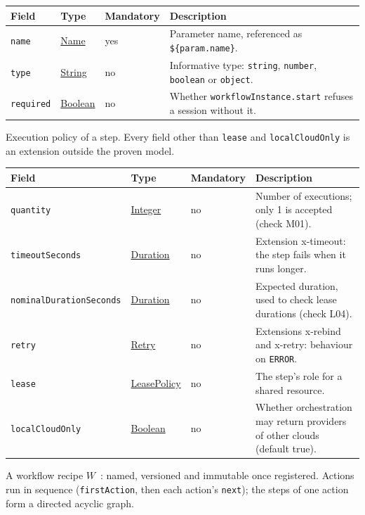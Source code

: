 \documentclass[a4paper]{arrowhead}
\newcommand{\mref}[1]{{\textcolor{ArrowheadPurple}{\hyperref[sec:model:#1]{#1}}}}
\newcommand{\pref}[1]{{\textcolor{ArrowheadGrey}{\hyperref[sec:model:primitives:#1]{#1}}}}
\begin{document}
{\small
\begin{longtable}{|p{3.7cm}|p{4.2cm}|p{1.6cm}|p{6.3cm}|}

\hline
\rowcolor{gray!33} Field & Type & Mandatory & Description \\ \hline
\endhead
\texttt{name} & \pref{Name} & yes & Parameter name, referenced as \texttt{\$\{param.name\}}. \\ \hline
\texttt{type} & \pref{String} & no & Informative type: \texttt{string}, \texttt{number}, \texttt{boolean} or \texttt{object}. \\ \hline
\texttt{required} & \pref{Boolean} & no & Whether \texttt{workflow\allowbreak{}Instance.\allowbreak{}start} refuses a session without it. \\ \hline
\end{longtable}
}

Execution policy of a step. Every field other than \texttt{lease} and \texttt{local\allowbreak{}Cloud\allowbreak{}Only} is an extension outside the proven model.

{\small
\begin{longtable}{|p{3.7cm}|p{4.2cm}|p{1.6cm}|p{6.3cm}|}

\hline
\rowcolor{gray!33} Field & Type & Mandatory & Description \\ \hline
\endhead
\texttt{quantity} & \pref{Integer} & no & Number of executions; only 1 is accepted (check M01). \\ \hline
\texttt{timeout\allowbreak{}Seconds} & \pref{Duration} & no & Extension x-timeout: the step fails when it runs longer. \\ \hline
\texttt{nominal\allowbreak{}Duration\allowbreak{}Seconds} & \pref{Duration} & no & Expected duration, used to check lease durations (check L04). \\ \hline
\texttt{retry} & \mref{Retry} & no & Extensions x-rebind and x-retry: behaviour on \texttt{ERROR}. \\ \hline
\texttt{lease} & \mref{LeasePolicy} & no & The step's role for a shared resource. \\ \hline
\texttt{local\allowbreak{}Cloud\allowbreak{}Only} & \pref{Boolean} & no & Whether orchestration may return providers of other clouds (default true). \\ \hline
\end{longtable}
}

A workflow recipe $W$~\cite{varga2026}: named, versioned and immutable once registered. Actions run in sequence (\texttt{firstAction}, then each action's \texttt{next}); the steps of one action form a directed acyclic graph.
\end{document}
